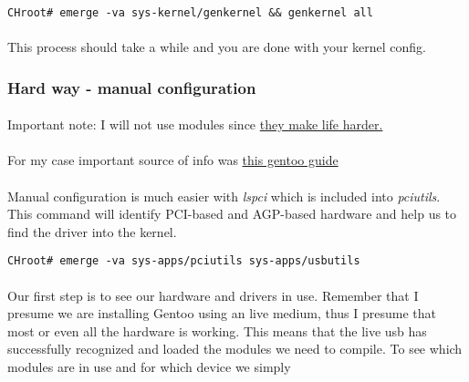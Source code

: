 \documentclass[11pt,a4paper]{article}
\begin{document}
                \begin{lstlisting}[style=BashInputCHRoot]
 CHroot# emerge -va sys-kernel/genkernel && genkernel all
                \end{lstlisting}

                \paragraph{} This process should take a while and you are done with your kernel config.

            \newpage
            \subsubsection{Hard way - manual configuration}

                \paragraph{} Important note: I will not use modules since \href{https://wiki.gentoo.org/wiki/Kernel/Gentoo_Kernel_Configuration_Guide#Modules_do_not_get_loaded_automatically}{they make life harder.}

                \paragraph{} For my case important source of info was \href{https://wiki.gentoo.org/wiki/Lenovo_ThinkPad_T440s}{this gentoo guide}

                \paragraph{} Manual configuration is much easier with \textit{lspci} which is included into \textit{pciutils}. This command will identify PCI-based and AGP-based hardware and help us to find the driver into the kernel.

                \begin{lstlisting}[style=BashInputCHRoot]
 CHroot# emerge -va sys-apps/pciutils sys-apps/usbutils
                \end{lstlisting}

                \paragraph{} Our first step is to see our hardware and drivers in use. Remember that I presume we are installing Gentoo using an live medium, thus I presume that most or even all the hardware is working. This means that the live usb has successfully recognized and loaded the modules we need to compile. To see which modules are in use and for which device we simply
\end{document}
